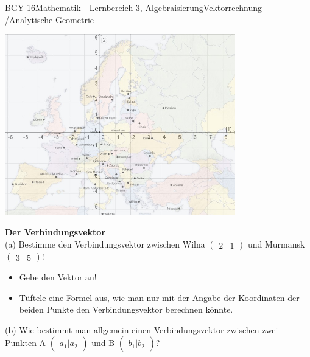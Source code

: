 \documentclass[oneside,openany,headings=optiontotoc,11pt,numbers=noenddot]{scrreprt}
\begin{document}
	\begin{worksheet}{BGY 16}{Mathematik - Lernbereich 3, Algebraisierung}{Vektorrechnung /Analytische Geometrie}
				
		\noindent
		\sffamily
		\begin{center}
		\includegraphics[width=0.75\textwidth]{MapKoord.jpg}
		\end{center}
		\begin{framed}
			\noindent
			\textbf{Der Verbindungsvektor}\\
			(a) Bestimme den Verbindungsvektor zwischen Wilna \(\begin{pmatrix}
			2 & 1
			\end{pmatrix}\) und Murmansk \(\begin{pmatrix}
			3 & 5
			\end{pmatrix}\)!
			\
			\begin{framed}
					\begin{itemize}
						\item Gebe den Vektor an!
						\item Tüftele eine Formel aus, wie man nur mit der Angabe der Koordinaten der beiden Punkte den Verbindungsvektor berechnen könnte.
					\end{itemize}
			\end{framed}
			\noindent
			(b) Wie bestimmt man allgemein einen Verbindungsvektor zwischen zwei Punkten A \(\begin{pmatrix}a_{1} | a_{2}\end{pmatrix}\) und B \(\begin{pmatrix}b_{1}|b_{2}\end{pmatrix}\)?\\

\end{framed}
\end{worksheet}
\end{document}
